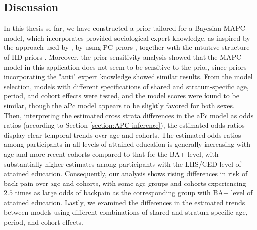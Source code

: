 \FloatBarrier
\subsection{Discussion}\label{section:Application1:Dicussion}
\vspace{-0.2cm}
In this thesis so far, we have constructed a prior tailored for a Bayesian MAPC model, which incorporates provided sociological expert knowledge, as inspired by the approach used by \cite{IngeborgGenetics}, by using PC priors \citep{PC-priors}, together with the intuitive structure of HD priors \citep{Jointprior}. Moreover, the prior sensitivity analysis showed that the MAPC model in this application does not seem to be sensitive to the prior, since priors incorporating the "anti" expert knowledge showed similar results. From the model selection, models with different specifications of shared and stratum-specific age, period, and cohort effects were tested, and the model scores were found to be similar, though the aPc model appears to be slightly favored for both sexes. Then, interpreting the estimated cross strata differences in the aPc model as odds ratios (according to Section \ref{section:APC-inference}), the estimated odds ratios display clear temporal trends over age and cohorts. The estimated odds ratios among participants in all levels of attained education is generally increasing with age and more recent cohorts compared to that for the BA+ level, with substantially higher estimates among participants with the LHS/GED level of attained education. Consequently, our analysis shows rising differences in risk of back pain over age and cohorts, with some age groups and cohorts experiencing $2.5$ times as large odds of backpain as the corresponding group with BA+ level of attained education. Lastly, we examined the differences in the estimated trends between models using different combinations of shared and stratum-specific age, period, and cohort effects.

